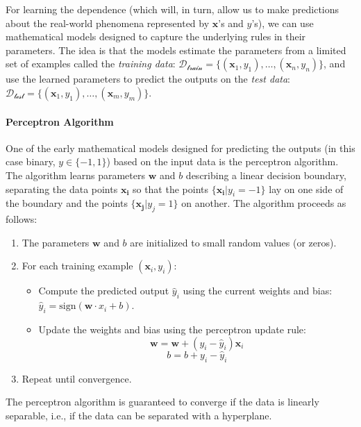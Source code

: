 For learning the dependence (which will, in turn, allow us to make predictions about the real-world phenomena represented by $\mathbf{x}$'s and $y$'s), we can use mathematical models designed to capture the underlying rules in their parameters. The idea is that the models estimate the parameters from a limited set of examples called the \textit{training data}:  $\mathcal{D_{\text{train}}} = \{(\mathbf{x}_1, y_1), \ldots, (\mathbf{x}_{n}, y_{n})\}$, and use the learned parameters to predict the outputs on the \textit{test data}: $\mathcal{D_{\text{test}}} = \{(\mathbf{x}_1, y_1), \ldots, (\mathbf{x}_{m}, y_{m})\}$.

\paragraph{Perceptron Algorithm} One of the early mathematical models designed for predicting the outputs (in this case binary, $y \in \{-1, 1\}$) based on the input data is the perceptron algorithm. The algorithm learns parameters $\textbf{w}$ and $b$ describing a linear decision boundary, separating the data points $\mathbf{x_i}$ so that the points $\{\mathbf{x_i} | y_i = -1\}$ lay on one side of the boundary and the points $\{\mathbf{x_j} | y_j = 1\}$ on another. The algorithm proceeds as follows:




\begin{enumerate}
    \item The parameters $\textbf{w}$ and $b$ are initialized to small random values (or zeros).
    \item For each training example $(\mathbf{x}_i, y_i)$:
          \begin{itemize}
              \item Compute the predicted output $\hat{y}_i$ using the current weights and bias: $\hat{y}_i = \text{sign}(\textbf{w} \cdot x_i + b)$.
              \item Update the weights and bias using the perceptron update rule:
                    \[ \textbf{w} = \textbf{w} + (y_i - \hat{y}_i) \textbf{x}_i \]
                    \[ b = b + y_i - \hat{y}_i \]
          \end{itemize}
    \item Repeat until convergence.
\end{enumerate}

The perceptron algorithm is guaranteed to converge if the data is linearly separable, i.e., if the data can be separated with a hyperplane.



